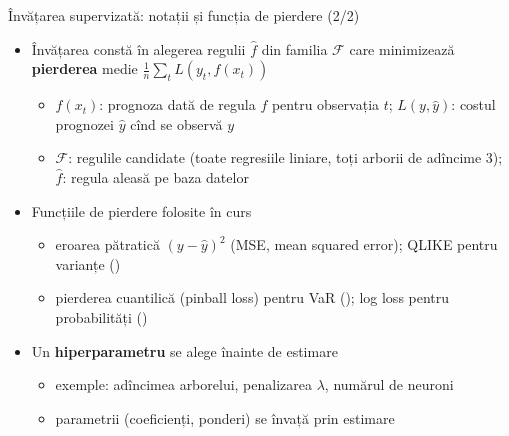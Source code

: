 \begin{frame}{Învățarea supervizată: notații și funcția de pierdere (2/2)}
\itemsize{\small}
\begin{itemize}
    \item Învățarea constă în alegerea regulii $\hat f$ din familia $\mathcal{F}$ care minimizează \textbf{pierderea} medie $\frac1n\sum_t L(y_t, f(x_t))$
    \begin{itemize}
        \item $f(x_t)$: prognoza dată de regula $f$ pentru observația $t$; $L(y, \hat y)$: costul prognozei $\hat y$ cînd se observă $y$
        \item $\mathcal{F}$: regulile candidate (toate regresiile liniare, toți arborii de adîncime 3); $\hat f$: regula aleasă pe baza datelor
    \end{itemize}
    \item Funcțiile de pierdere folosite în curs
    \begin{itemize}
        \item eroarea pătratică $(y - \hat y)^2$ (MSE, mean squared error); QLIKE pentru varianțe ()
        \item pierderea cuantilică (pinball loss) pentru VaR (); log loss pentru probabilități ()
    \end{itemize}
    \item Un \textbf{hiperparametru} se alege înainte de estimare
    \begin{itemize}
        \item exemple: adîncimea arborelui, penalizarea $\lambda$, numărul de neuroni
        \item parametrii (coeficienți, ponderi) se învață prin estimare
    \end{itemize}
\end{itemize}
\end{frame}

